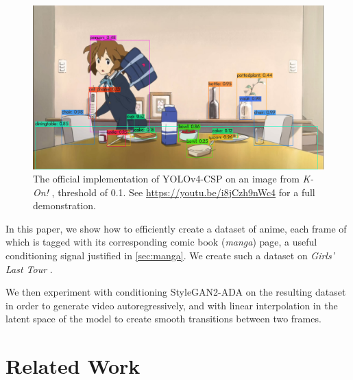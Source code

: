 \documentclass[11pt, oneside]{article}
\begin{document}
\begin{figure}[h!]
  \centering
  \includegraphics[scale=0.18,trim={0 0 0 190px},clip]{yolov4}
  \caption{The official implementation of YOLOv4-CSP \cite{yolov4}
    on an image from \textit{K-On!} \cite{kon!}, threshold of 0.1. See
    \href{https://youtu.be/i8jCzh9nWc4}{https://youtu.be/i8jCzh9nWc4}
    for a full demonstration.}
  \label{fig:object}
\end{figure}

In this paper, we show how to efficiently create a dataset of anime, each frame
of which is tagged with its corresponding comic book (\textit{manga}) page, a
useful conditioning signal justified in \autoref{sec:manga}. We create such a
dataset on \textit{Girls' Last Tour} \cite{tour}.

We then experiment with conditioning StyleGAN2-ADA \cite{stylegan2ada} on the
resulting dataset in order to generate video autoregressively, and with linear
interpolation in the latent space of the model to create smooth transitions
between two frames.

\section{Related Work}
\end{document}
